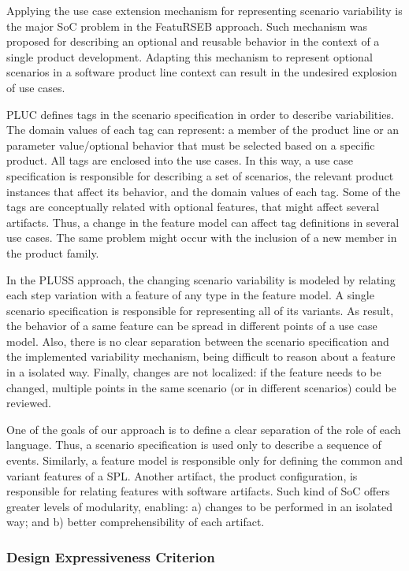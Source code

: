 \documentclass{llncs}
\begin{document}
Applying the use case extension mechanism for representing scenario
variability is the major SoC problem in the FeatuRSEB approach. Such
mechanism was proposed for describing an optional and reusable behavior in
the context of a single product development. Adapting this mechanism to represent
optional scenarios in a software product line context can result in the undesired
explosion of use cases.

PLUC defines tags in the scenario specification in order to describe
variabilities. The domain values of each tag can represent: a member
of the product line or an parameter value/optional behavior that
must be selected based on a specific product. All tags are enclosed
into the use cases. In this way, a use case specification is
responsible for describing a set of scenarios, the relevant product
instances that affect its behavior, and the domain values of each
tag. Some of the tags are conceptually related with optional
features, that might affect several artifacts. Thus, a change in the
feature model can affect tag definitions in several use cases. The
same problem might occur with the inclusion of a new member in the
product family.

In the PLUSS approach, the changing scenario variability is modeled
by relating each step variation with a feature of any type in the
feature model. A single scenario specification is responsible for
representing all of its variants. As result, the behavior of a same
feature can be spread in different points of a use case model. Also,
there is no clear separation between the scenario specification and
the implemented variability mechanism, being difficult to reason
about a feature in a isolated way. Finally, changes are not
localized: if the feature needs to be changed, multiple points in
the same scenario (or in different scenarios) could be reviewed.

One of the goals of our approach is to define a clear separation of
the role of each language. Thus, a scenario specification
is used only to describe a sequence of events. Similarly, a feature
model is responsible only for defining the common and
variant features of a SPL. Another artifact, the product
configuration, is responsible for relating features with software
artifacts. Such kind of SoC offers greater levels of modularity,
enabling: a) changes to be performed in an isolated way; and b)
better comprehensibility of each artifact.

\subsubsection{Design Expressiveness Criterion}
\end{document}
